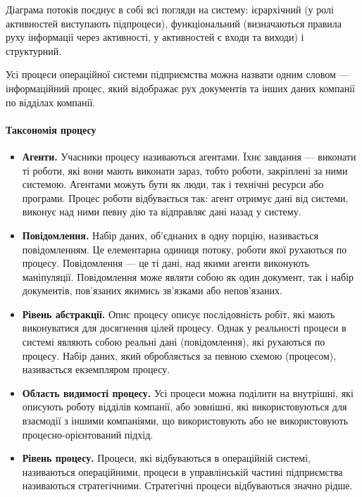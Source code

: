 \documentclass{memoir}
\begin{document}
Діаграма потоків поєднує в собі всі погляди на систему: ієрархічний (у ролі активностей виступають підпроцеси), функціональний (визначаються правила руху інформації через активності, у активностей є входи та виходи) і структурний.

Усі процеси операційної системи підприємства можна назвати одним словом — інформаційний процес, який відображає рух документів та інших даних компанії по відділах компанії.

\paragraph{Таксономія процесу}

\begin{itemize}
    \item \textbf{Агенти.} Учасники процесу називаються агентами. Їхнє завдання — виконати ті роботи, які вони мають виконати зараз, тобто роботи, закріплені за ними системою. Агентами можуть бути як люди, так і технічні ресурси або програми. Процес роботи відбувається так: агент отримує дані від системи, виконує над ними певну дію та відправляє дані назад у систему.
    \item \textbf{Повідомлення.} Набір даних, об’єднаних в одну порцію, називається повідомленням. Це елементарна одиниця потоку, роботи якої рухаються по процесу. Повідомлення — це ті дані, над якими агенти виконують маніпуляції. Повідомлення може являти собою як один документ, так і набір документів, пов’язаних якимись зв’язками або непов’язаних.
    \item \textbf{Рівень абстракції.} Опис процесу описує послідовність робіт, які мають виконуватися для досягнення цілей процесу. Однак у реальності процеси в системі являють собою реальні дані (повідомлення), які рухаються по процесу. Набір даних, який обробляється за певною схемою (процесом), називається екземпляром процесу.
    \item \textbf{Область видимості процесу.} Усі процеси можна поділити на внутрішні, які описують роботу відділів компанії, або зовнішні, які використовуються для взаємодії з іншими компаніями, що використовують або не використовують процесно-орієнтований підхід.
    \item \textbf{Рівень процесу.} Процеси, які відбуваються в операційній системі, називаються операційними, процеси в управлінській частині підприємства називаються стратегічними. Стратегічні процеси відбуваються значно рідше.
\end{itemize}
\end{document}
